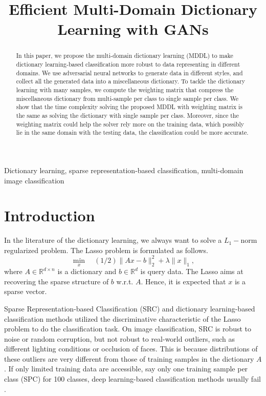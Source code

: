\documentclass{article}
\title{Efficient Multi-Domain Dictionary Learning with GANs}
\begin{document}
\maketitle
\begin{abstract}
In this paper, we propose the multi-domain dictionary learning (MDDL) to make dictionary learning-based classification more robust to data representing in different domains. We use adversarial neural networks to generate data in different styles, and collect all the generated data into a miscellaneous dictionary. To tackle the dictionary learning with many samples, we compute the weighting matrix that compress the miscellaneous dictionary from multi-sample per class to single sample per class. We show that the time complexity solving the proposed MDDL with weighting matrix is the same as solving the dictionary with single sample per class. Moreover, since the weighting matrix could help the solver rely more on the training data, which possibly lie in the same domain with the testing data, the classification could be more accurate. 
\end{abstract}
\begin{keywords}
Dictionary learning, sparse representation-based classification, multi-domain image classification
\end{keywords}
\section{Introduction}
\label{sec:intro}

In the literature of the dictionary learning, we always want to solve a $L_1-$norm regularized problem. 
The Lasso problem \cite{tibshirani1996regression} is formulated as follows.
\begin{equation}
\label{v_lasso}
\min_x \quad(1/2)\|Ax-b\|^2_2+\lambda\|x\|_1 ,
\end{equation}
where $A \in \mathbb{R}^{d \times n}$ is a dictionary and $b \in \mathbb{R}^{d}$ is query data. The Lasso aims at recovering the sparse structure of $b$ w.r.t. $A$. Hence, it is expected that $x$ is a sparse vector.

Sparse Representation-based Classification (SRC) \cite{wright2009pami} and dictionary learning-based classification methods utilized the discriminative characteristic of the Lasso problem to do the classification task. On image classification, SRC is robust to noise or random corruption, but not robust to real-world outliers, such as different lighting conditions or occlusion of faces. This is because distributions of these outliers are very different from those of training samples in the dictionary $A$. If only limited training data are accessible, say only one training sample per class (SPC) for 100 classes, deep learning-based classification methods usually fail \cite{wu2018occluded} \cite{ghazi2016cvprw}.
\end{document}
